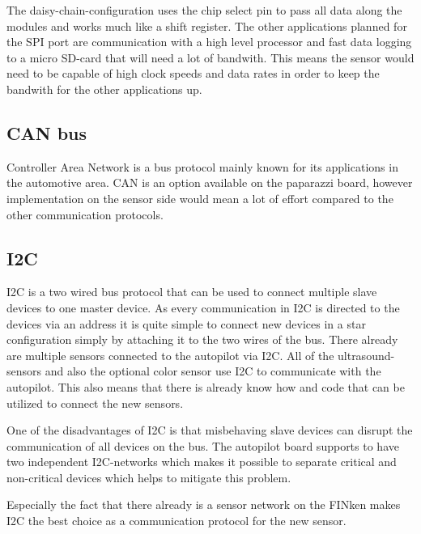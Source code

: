 The daisy-chain-configuration uses the chip select pin to pass all data along the modules and works much like a shift register.
The other applications planned for the SPI port are communication with a high level processor and fast data logging to a micro SD-card that will need a lot of bandwith.
This means the sensor would need to be capable of high clock speeds and data rates in order to keep the bandwith for the other applications up.

\subsection{CAN bus}
Controller Area Network is a bus protocol mainly known for its applications in the automotive area.
CAN is an option available on the paparazzi board, however implementation on the sensor side would mean a lot of effort compared to the other communication protocols.


\subsection{I2C}

I2C is a two wired bus protocol that can be used to connect multiple slave devices to one master device.
As every communication in I2C is directed to the devices via an address it is quite simple to connect new devices in a star configuration simply by attaching it to the two wires of the bus.
There already are multiple sensors connected to the autopilot via I2C.
All of the ultrasound-sensors and also the optional color sensor use I2C to communicate with the autopilot.
This also means that there is already know how and code that can be utilized to connect the new sensors.

One of the disadvantages of I2C is that misbehaving slave devices can disrupt the communication of all devices on the bus.
The autopilot board supports to have two independent I2C-networks which makes it possible to separate critical and non-critical devices which helps to mitigate this problem.

Especially the fact that there already is a sensor network on the FINken makes I2C the best choice as a communication protocol for the new sensor.
